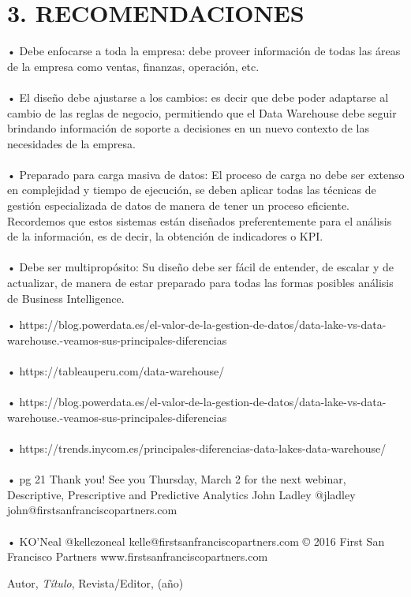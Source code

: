 \section{3.	RECOMENDACIONES }
\item{•	Debe enfocarse a toda la empresa: debe proveer información de todas las áreas de la empresa como ventas, finanzas, operación, etc.\\\\
•	El diseño debe ajustarse a los cambios: es decir que debe poder adaptarse al cambio de las reglas de negocio, permitiendo que el Data Warehouse debe seguir brindando información de soporte a decisiones en un nuevo contexto de las necesidades de la empresa.\\\\
•	Preparado para carga masiva de datos: El proceso de carga no debe ser extenso en complejidad y tiempo de ejecución, se deben aplicar todas las técnicas de gestión especializada de datos de manera de tener un proceso eficiente. Recordemos que estos sistemas están diseñados preferentemente para el análisis de la información, es de decir, la obtención de indicadores o KPI.\\\\
•	Debe ser multipropósito: Su diseño debe ser fácil de entender, de escalar y de actualizar, de manera de estar preparado para todas las formas posibles análisis de Business Intelligence.
}

\begin{thebibliography}{99}
•	https://blog.powerdata.es/el-valor-de-la-gestion-de-datos/data-lake-vs-data-warehouse.-veamos-sus-principales-diferencias\\\\
•	https://tableauperu.com/data-warehouse/\\\\
•	https://blog.powerdata.es/el-valor-de-la-gestion-de-datos/data-lake-vs-data-warehouse.-veamos-sus-principales-diferencias\\\\
•	https://trends.inycom.es/principales-diferencias-data-lakes-data-warehouse/\\\\
•	pg 21 Thank	you! See	you	Thursday,	March	2 for	the	next webinar, Descriptive,	Prescriptive and	Predictive	Analytics John Ladley @jladley john@firstsanfranciscopartners.com\\\\
•	KO’Neal @kellezoneal kelle@firstsanfranciscopartners.com © 2016 First San Francisco Partners www.firstsanfranciscopartners.com

 Autor, \emph{Título}, Revista/Editor, (año)

\end{thebibliography}


